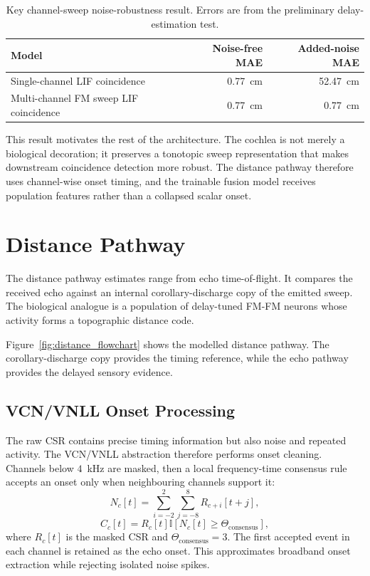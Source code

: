 \begin{table}[h]
    \centering
    \caption{Key channel-sweep noise-robustness result. Errors are from the preliminary delay-estimation test.}
    \label{tab:sweep_noise_key_result}
    \begin{tabular}{lrr}
        \toprule
        Model & Noise-free MAE & Added-noise MAE \\
        \midrule
        Single-channel LIF coincidence & 0.77~cm & 52.47~cm \\
        Multi-channel FM sweep LIF coincidence & 0.77~cm & 0.77~cm \\
        \bottomrule
    \end{tabular}
\end{table}

This result motivates the rest of the architecture. The cochlea is not merely a biological decoration; it preserves a tonotopic sweep representation that makes downstream coincidence detection more robust. The distance pathway therefore uses channel-wise onset timing, and the trainable fusion model receives population features rather than a collapsed scalar onset.

\section{Distance Pathway}

The distance pathway estimates range from echo time-of-flight. It compares the received echo against an internal corollary-discharge copy of the emitted sweep. The biological analogue is a population of delay-tuned FM-FM neurons whose activity forms a topographic distance code.



Figure~\ref{fig:distance_flowchart} shows the modelled distance pathway. The corollary-discharge copy provides the timing reference, while the echo pathway provides the delayed sensory evidence.

\subsection{VCN/VNLL Onset Processing}

The raw CSR contains precise timing information but also noise and repeated activity. The VCN/VNLL abstraction therefore performs onset cleaning. Channels below $4$~kHz are masked, then a local frequency-time consensus rule accepts an onset only when neighbouring channels support it:
\begin{equation}
    N_c[t] = \sum_{i=-2}^{2}\sum_{j=-8}^{8} R_{c+i}[t+j],
\end{equation}
\begin{equation}
    C_c[t] = R_c[t]\mathbb{I}[N_c[t]\geq \Theta_{\mathrm{consensus}}],
\end{equation}
where $R_c[t]$ is the masked CSR and $\Theta_{\mathrm{consensus}}=3$. The first accepted event in each channel is retained as the echo onset. This approximates broadband onset extraction while rejecting isolated noise spikes.


